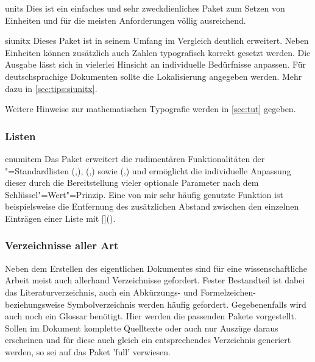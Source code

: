 %
\begin{packages}
%
\item[units]
  Dies ist ein einfaches und sehr zweckdienliches Paket zum Setzen von 
  Einheiten und für die meisten Anforderungen völlig ausreichend.
\item[siunitx]
  Dieses Paket ist in seinem Umfang im Vergleich deutlich erweitert. Neben 
  Einheiten können zusätzlich auch Zahlen typografisch korrekt gesetzt werden. 
  Die Ausgabe lässt sich in vielerlei Hinsicht an individuelle Bedürfnisse 
  anpassen. Für deutschsprachige Dokumenten sollte die Lokalisierung angegeben 
  werden. Mehr dazu in \autoref{sec:tips:siunitx}.
%
\end{packages}
%
Weitere Hinweise zur mathematischen Typografie werden in \autoref{sec:tut} 
gegeben.%
%



\subsubsection{%
  Listen%
}
\begin{packages}
\item[enumitem]
  Das Paket  erweitert die rudimentären Funktionalitäten der 
  "=Standardlisten
  (,),
  (,) sowie
  (,) und
  ermöglicht die individuelle Anpassung dieser durch die Bereitstellung vieler 
  optionale Parameter nach dem Schlüssel"=Wert"=Prinzip. Eine von mir sehr 
  häufig genutzte Funktion ist beispielsweise die Entfernung des zusätzlichen 
  Abstand zwischen den einzelnen Einträgen einer Liste mit 
  []().
\end{packages}
%



\subsubsection{%
  Verzeichnisse aller Art%
}
Neben dem Erstellen des eigentlichen Dokumentes sind für eine wissenschaftliche 
Arbeit meist auch allerhand Verzeichnisse gefordert. Fester Bestandteil ist 
dabei das Literaturverzeichnis, auch ein Abkürzungs- und Formelzeichen- 
beziehungsweise Symbolverzeichnis werden häufig gefordert. Gegebenenfalls wird 
auch noch ein Glossar benötigt. Hier werden die passenden Pakete vorgestellt. 
Sollen im Dokument komplette Quelltexte oder auch nur Auszüge daraus erscheinen 
und für diese auch gleich ein entsprechendes Verzeichnis generiert werden, so 
sei auf das Paket 'full' verwiesen.

